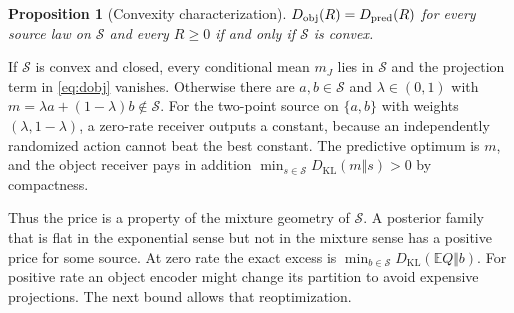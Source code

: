 \documentclass[10pt,journal]{IEEEtran}
\newtheorem{proposition}{Proposition}
\newcommand{\E}{\mathbb E}
\newcommand{\Sset}{\mathcal S}
\newcommand{\KL}{D_{\mathrm{KL}}}
\begin{document}
\begin{proposition}[Convexity characterization]\label{prop:convex}
$D_{\rm obj}(R)=D_{\rm pred}(R)$ for every source law on $\Sset$ and every $R\ge0$ if and only if $\Sset$ is convex.
\end{proposition}
\begin{IEEEproof}
If $\Sset$ is convex and closed, every conditional mean $m_J$ lies in $\Sset$ and the projection term in \eqref{eq:dobj} vanishes. Otherwise there are $a,b\in\Sset$ and $\lambda\in(0,1)$ with $m=\lambda a+(1-\lambda)b\notin\Sset$. For the two-point source on $\{a,b\}$ with weights $(\lambda,1-\lambda)$, a zero-rate receiver outputs a constant, because an independently randomized action cannot beat the best constant. The predictive optimum is $m$, and the object receiver pays in addition $\min_{s\in\Sset}\KL(m\Vert s)>0$ by compactness.
\end{IEEEproof}
Thus the price is a property of the mixture geometry of $\Sset$. A posterior family that is flat in the exponential sense but not in the mixture sense has a positive price for some source. At zero rate the exact excess is $\min_{b\in\Sset}\KL(\E Q\Vert b)$. For positive rate an object encoder might change its partition to avoid expensive projections. The next bound allows that reoptimization.
\end{document}
